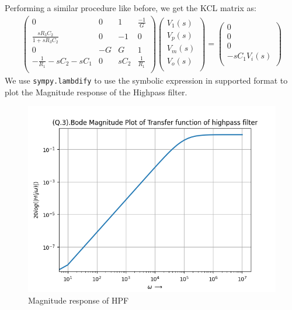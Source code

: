 \documentclass[11pt, a4paper]{article}
\begin{document}
Performing a similar procedure like before, we get the KCL matrix as:
\begin{gather}
    \begin{pmatrix}
            0&0&1&\frac{-1}{G}\\
            \frac{sR_3C_2}{1+sR_3C_2}&0&-1&0\\
            0&-G&G&1\\
            -\frac{1}{R_1}-sC_2-sC_1&0&sC_2&\frac{1}{R_1}\\
        \end{pmatrix}
        \begin{pmatrix}
            V_1(s)\\
            V_p(s)\\
            V_m(s)\\
            V_o(s)\\
        \end{pmatrix}
        =
        \begin{pmatrix}
            0\\
            0\\
            0\\
            -sC_1V_i(s)\\
        \end{pmatrix}
\end{gather}
We use \texttt{sympy.lambdify} to use the symbolic expression in supported format to plot the Magnitude response of the Highpass filter. 
\begin{figure}[H]
    \centering
    \includegraphics[scale=0.6]{Figure_3.png}
    \caption{Magnitude response of HPF}
    \label{fig:Fig6}
\end{figure}
\end{document}

